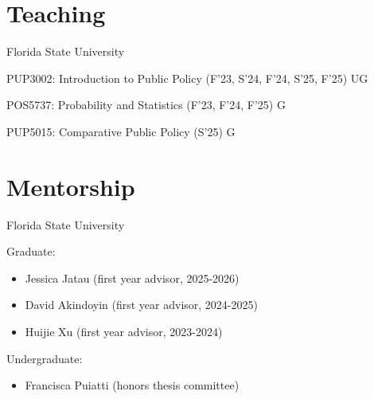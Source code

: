 \documentclass[margin,line,10.95pt]{res}
\newenvironment{list1}{
  \begin{list}{\ding{113}}{%
      \setlength{\itemsep}{0in}
      \setlength{\parsep}{0in} \setlength{\parskip}{0in}
      \setlength{\topsep}{0in} \setlength{\partopsep}{0in}
      \setlength{\leftmargin}{0.17in}}}{\end{list}}
\begin{document}
\begin{resume}
\section{\sc Teaching }

{Florida State University}\\
\vspace*{-.1in}
\begin{list1}
\item[] PUP3002: Introduction to Public Policy (F'23, S'24, F'24, S'25, F'25) UG
\item[] POS5737: Probability and Statistics (F'23, F'24, F'25) G
\item[] PUP5015: Comparative Public Policy (S'25) G
\end{list1}

\section{\sc Mentorship}

{Florida State University}\\
\vspace*{-.1in}
\begin{list1}
\item[] Graduate:
\begin{itemize}
	\item Jessica Jatau (first year advisor, 2025-2026) 
	\item David Akindoyin (first year advisor, 2024-2025) 
	\item Huijie Xu (first year advisor, 2023-2024)
	\end{itemize}
	\item[] Undergraduate:
	\begin{itemize}
	\item Francisca Puiatti (honors thesis committee)

	\end{itemize}
\end{list1}




\end{resume}
\end{document}
